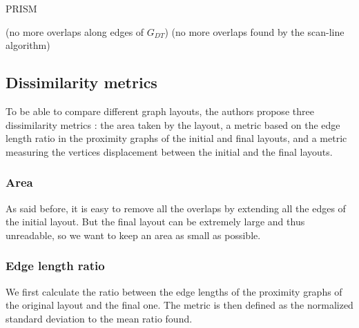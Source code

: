 \documentclass[12pt]{report}
\begin{document}
\bigskip
\begin{algorithm}[H]
\caption{PRISM}
	 
(no more overlaps along edges of $G_{DT}$)
\BlankLine
{}	
(no more overlaps found by the scan-line algorithm)
\end{algorithm}

\subsection{Dissimilarity metrics}

To be able to compare different graph layouts, the authors propose three dissimilarity metrics : the area taken by the layout, a metric based on the edge length ratio in the proximity graphs of the initial and final layouts, and a metric measuring the vertices displacement between the initial and the final layouts.

\subsubsection{Area}
As said before, it is easy to remove all the overlaps by extending all the edges of the initial layout. But the final layout can be extremely large and thus unreadable, so we want to keep an area as small as possible.

\subsubsection{Edge length ratio}
We first calculate the ratio between the edge lengths of the proximity graphs of the original layout and the final one. The metric is then defined as the normalized standard deviation to the mean ratio found.
\end{document}
